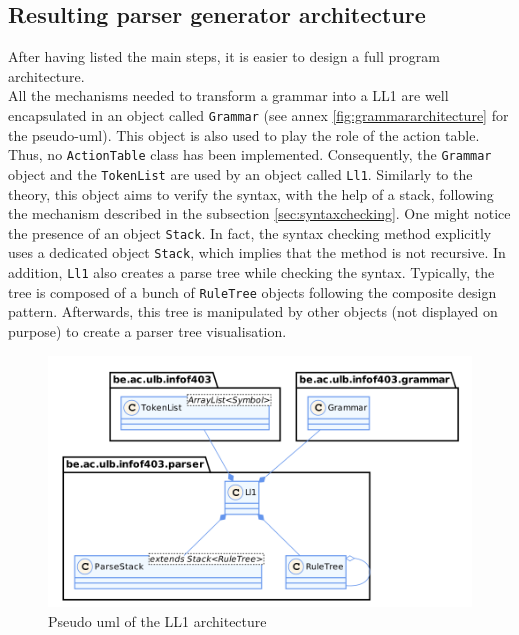 \documentclass[a4paper,11pt]{article}
\begin{document}
  \subsection{Resulting parser generator architecture}
    After having listed the main steps, it is easier to design a full program architecture.\\
    All the mechanisms needed to transform a grammar into a LL1 are well encapsulated in an object called \verb|Grammar| (see annex \ref{fig:grammararchitecture} for the pseudo-uml). This object is also used to play the role of the action table. Thus, no \verb|ActionTable| class has been implemented. Consequently, the \verb|Grammar| object and the \verb|TokenList| are used by an object called \verb|Ll1|. Similarly to the theory, this object aims to verify the syntax, with the help of a stack, following the mechanism described in the subsection \ref{sec:syntaxchecking}. One might notice the presence of an object \verb|Stack|. In fact, the syntax checking method explicitly uses a dedicated object \verb|Stack|, which implies that the method is not recursive. In addition, \verb|Ll1| also creates a parse tree while checking the syntax. Typically, the tree is composed of a bunch of \verb|RuleTree| objects following the composite design pattern. Afterwards, this tree is manipulated by other objects (not displayed on purpose) to create a parser tree visualisation.
    \begin{figure}[h!]
      \centering
      \includegraphics[scale=0.275]{./img/class_ll1.png}
      \caption{Pseudo uml of the LL1 architecture}
      \label{fig:architecturell1}
    \end{figure}
  
\end{document}
